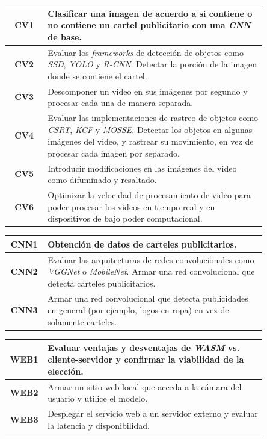\documentclass[a4paper]{article}
\begin{document}
\begin{center}
\begin{tabular}{c m{0.85\linewidth}} \toprule
    \textbf{CV1} & Clasificar una imagen de acuerdo a si contiene o no contiene un cartel publicitario con una \textit{CNN} de base. \\ \midrule
    \textbf{CV2} & Evaluar los \textit{frameworks} de detección de objetos como \textit{SSD}, \textit{YOLO} y \textit{R-CNN}. \newline Detectar la porción de la imagen donde se contiene el cartel. \\ \midrule
    \textbf{CV3} & Descomponer un video en sus imágenes por segundo y procesar cada una de manera separada. \\ \midrule
    \textbf{CV4} & Evaluar las implementaciones de rastreo de objetos como \textit{CSRT}, \textit{KCF} y \textit{MOSSE}. \newline Detectar los objetos en algunas imágenes del video, y rastrear su movimiento, en vez de procesar cada imagen por separado. \\ \midrule
    \textbf{CV5} & Introducir modificaciones en las imágenes del video como difuminado y resaltado. \\ \midrule
    \textbf{CV6} & Optimizar la velocidad de procesamiento de video para poder procesar los videos en tiempo real y en dispositivos de bajo poder computacional. \\ \bottomrule
\end{tabular}
\end{center}

\begin{center}
\begin{tabular}{c m{0.85\linewidth}} \toprule
    \textbf{CNN1} & Obtención de datos de carteles publicitarios. \\ \midrule
    \textbf{CNN2} & Evaluar las arquitecturas de redes convolucionales como \textit{VGGNet} o \textit{MobileNet}. \newline Armar una red convolucional que detecta carteles publicitarios. \\ \midrule
    \textbf{CNN3} & Armar una red convolucional que detecta publicidades en general (por ejemplo, logos en ropa) en vez de solamente carteles. \\ \bottomrule
\end{tabular}
\end{center}

\begin{center}
\begin{tabular}{c m{0.85\linewidth}} \toprule
    \textbf{WEB1} & Evaluar ventajas y desventajas de \textit{WASM} vs. cliente-servidor y confirmar la viabilidad de la elección. \\ \midrule
    \textbf{WEB2} & Armar un sitio web local que acceda a la cámara del usuario y utilice el modelo. \\ \midrule
    \textbf{WEB3} & Desplegar el servicio web a un servidor externo y evaluar la latencia y disponibilidad. \\ \bottomrule
\end{tabular}
\end{center}
\end{document}
